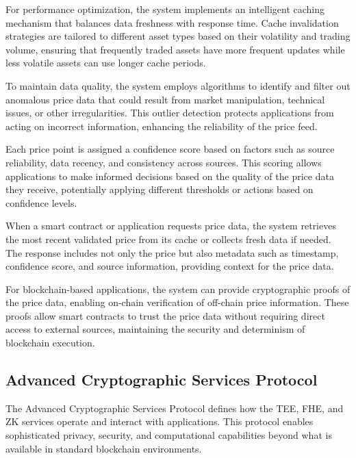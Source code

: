 \documentclass[12pt,a4paper]{article}
\begin{document}
For performance optimization, the system implements an intelligent caching mechanism that balances data freshness with response time. Cache invalidation strategies are tailored to different asset types based on their volatility and trading volume, ensuring that frequently traded assets have more frequent updates while less volatile assets can use longer cache periods.

To maintain data quality, the system employs algorithms to identify and filter out anomalous price data that could result from market manipulation, technical issues, or other irregularities. This outlier detection protects applications from acting on incorrect information, enhancing the reliability of the price feed.

Each price point is assigned a confidence score based on factors such as source reliability, data recency, and consistency across sources. This scoring allows applications to make informed decisions based on the quality of the price data they receive, potentially applying different thresholds or actions based on confidence levels.

When a smart contract or application requests price data, the system retrieves the most recent validated price from its cache or collects fresh data if needed. The response includes not only the price but also metadata such as timestamp, confidence score, and source information, providing context for the price data.

For blockchain-based applications, the system can provide cryptographic proofs of the price data, enabling on-chain verification of off-chain price information. These proofs allow smart contracts to trust the price data without requiring direct access to external sources, maintaining the security and determinism of blockchain execution.

\subsection{Advanced Cryptographic Services Protocol}
\label{subsec:advanced-crypto-protocol-spec}

The Advanced Cryptographic Services Protocol defines how the TEE, FHE, and ZK services operate and interact with applications. This protocol enables sophisticated privacy, security, and computational capabilities beyond what is available in standard blockchain environments.


\end{document}

